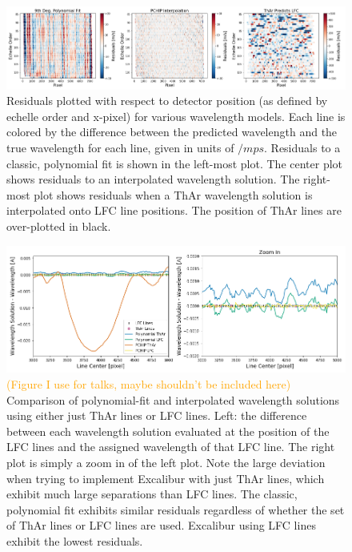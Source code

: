 \documentclass[twocolumn]{aastex63}
\newcommand{\lz}[1]{\textcolor{orange}{#1}}
\begin{document}
\begin{figure}[t]
\centering
\includegraphics[width=\textwidth]{Figures/lineResids2D.png}
\caption{Residuals plotted with respect to detector position (as defined by echelle order and x-pixel) for various wavelength models.  Each line is colored by the difference between the predicted wavelength and the true wavelength for each line, given in units of $/mps$.  Residuals to a classic, polynomial fit is shown in the left-most plot.  The center plot shows residuals to an interpolated wavelength solution.  The right-most plot shows residuals when a ThAr wavelength solution is interpolated onto LFC line positions.  The position of ThAr lines are over-plotted in black.}
\label{fig:resid2d}
\end{figure}

\begin{figure}[t]
\centering
\includegraphics[width=\textwidth]{Figures/lineDensity.png}
\caption{\lz{(Figure I use for talks, maybe shouldn't be included here)}  Comparison of polynomial-fit and interpolated wavelength solutions using either just ThAr lines or LFC lines. Left: the difference between each wavelength solution evaluated at the position of the LFC lines and the assigned wavelength of that LFC line.  The right plot is simply a zoom in of the left plot.  Note the large deviation when trying to implement Excalibur with just ThAr lines, which exhibit much large separations than LFC lines.  The classic, polynomial  fit exhibits similar residuals regardless of whether the set of ThAr lines or LFC lines are used.  Excalibur using LFC lines exhibit the lowest residuals.}
\label{fig:waveResids}
\end{figure} 
\end{document}
